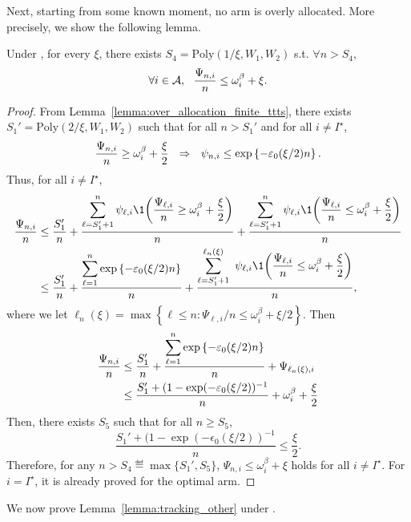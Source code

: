 Next, starting from some known moment, no arm is overly allocated. More precisely, we show the following lemma.

\begin{lemma}\label{lemma:psi_other_ttts}
    Under \TTTS, for every $\xi$, there exists $S_4 = \text{Poly}(1/\xi,W_1,W_2)$ s.t. $\forall n > S_4$,
    \[
        \forall i \in \mathcal{A}, \ \ \frac{\Psi_{n,i}}{n} \leq \omega_{i}^\beta + \xi.
    \]
\end{lemma}

\begin{proof}
    From Lemma~\ref{lemma:over_allocation_finite_ttts}, there exists $S_1' = \text{Poly}(2/\xi,W_1,W_2)$ such that for all $n > S_1'$ and for all $i\neq I^\star$, 
    \[
        \frac{\Psi_{n,i}}{n} \geq \omega_{i}^\beta + \frac{\xi}{2}  \ \ \Rightarrow \ \ \psi_{n,i} \leq \exp\left\{-\varepsilon_0(\xi/2) n\right\}.
    \] 
    Thus, for all $i \neq I^\star$,
    \begin{align*}
        \frac{\Psi_{n,i}}{n} 
        &\leq \frac{S_1'}{n} + \ddfrac{\sum_{\ell=S_1'+1}^n \psi_{\ell,i}\1{\left(\frac{\Psi_{\ell,i}}{n} \geq \omega_{i}^\beta+\frac{\xi}{2}\right)}}{n} + \ddfrac{\sum_{\ell=S_1'+1}^n \psi_{\ell,i}\1{\left(\frac{\Psi_{\ell,i}}{n} \leq \omega_{i}^\beta + \frac{\xi}{2}\right)}}{n} \\
        &\leq \frac{S_1'}{n} + \ddfrac{\sum_{\ell=1}^n \expp{-\epsilon_0(\xi/2) n}}{n} + \ddfrac{\sum_{\ell=S_1'+1}^{\ell_n(\xi)}\ \psi_{\ell,i}\1{\left(\frac{\Psi_{\ell,i}}{n} \leq \omega_{i}^\beta + \frac{\xi}{2}\right)}}{n},
    \end{align*}
    where we let $\ell_n(\xi) = \max\left\{ \ell \leq n : \Psi_{\ell,i}/n \leq \omega_{i}^\beta + \xi/2\right\}$. Then
    \begin{align*}
        \frac{\Psi_{n,i}}{n} 
        &\leq \frac{S_1'}{n} + \frac{\displaystyle \sum_{\ell=1}^n \exp\left\{-\varepsilon_0(\xi/2) n\right\}}{\displaystyle n} + \Psi_{\ell_n(\xi),i}\\
        &\leq \frac{S_1' + (1 - \exp(-\varepsilon_0(\xi/2))^{-1}}{n}+ \omega_{i}^\beta + \frac{\xi}{2}
    \end{align*}
    Then, there exists $S_5$ such that for all $n \geq S_5$,
    \[
        \frac{S_1' + (1 - \exp(-\epsilon_0(\xi/2))^{-1}}{n} \leq \frac{\xi}{2}.
    \]
    Therefore, for any $n > S_4 \eqdef \max\{S_1',S_5\}$, $\Psi_{n,i} \leq \omega_i^\beta + \xi$ holds for all $i\neq I^\star$. For $i = I^\star$, it is already proved for the optimal arm.
\end{proof}

We now prove Lemma~\ref{lemma:tracking_other} under \TTTS.

